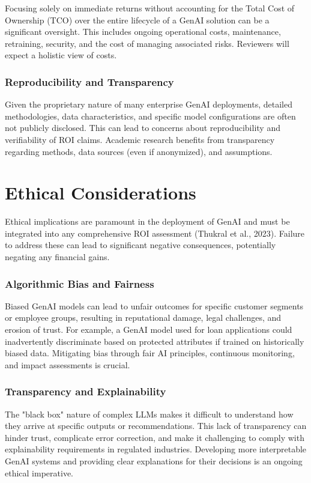 \documentclass[10pt,journal,compsoc,twocolumn]{IEEEtran}
\begin{document}
Focusing solely on immediate returns without accounting for the Total Cost of Ownership (TCO) over the entire lifecycle of a GenAI solution can be a significant oversight. This includes ongoing operational costs, maintenance, retraining, security, and the cost of managing associated risks. Reviewers will expect a holistic view of costs.


\subsubsection{Reproducibility and Transparency}

Given the proprietary nature of many enterprise GenAI deployments, detailed methodologies, data characteristics, and specific model configurations are often not publicly disclosed. This can lead to concerns about reproducibility and verifiability of ROI claims. Academic research benefits from transparency regarding methods, data sources (even if anonymized), and assumptions.


\section{Ethical Considerations}


Ethical implications are paramount in the deployment of GenAI and must be integrated into any comprehensive ROI assessment (Thukral et al., 2023). Failure to address these can lead to significant negative consequences, potentially negating any financial gains.


\subsubsection{Algorithmic Bias and Fairness}

Biased GenAI models can lead to unfair outcomes for specific customer segments or employee groups, resulting in reputational damage, legal challenges, and erosion of trust. For example, a GenAI model used for loan applications could inadvertently discriminate based on protected attributes if trained on historically biased data. Mitigating bias through fair AI principles, continuous monitoring, and impact assessments is crucial.


\subsubsection{Transparency and Explainability}

The "black box" nature of complex LLMs makes it difficult to understand how they arrive at specific outputs or recommendations. This lack of transparency can hinder trust, complicate error correction, and make it challenging to comply with explainability requirements in regulated industries. Developing more interpretable GenAI systems and providing clear explanations for their decisions is an ongoing ethical imperative.
\end{document}
